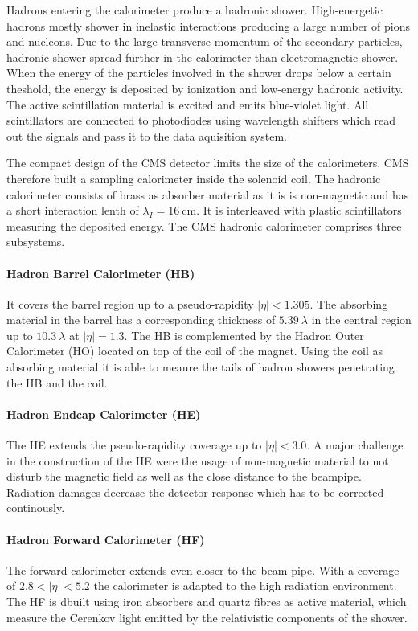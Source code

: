 Hadrons entering the calorimeter produce a hadronic shower. High-energetic
hadrons mostly shower in inelastic interactions producing a large number of pions
and nucleons. Due to the large transverse momentum of the secondary particles,
hadronic shower spread further in the calorimeter than electromagnetic shower.
When the energy of the particles involved in the shower drops below a certain
theshold, the energy is deposited by ionization and low-energy hadronic
activity. The active scintillation material is excited and emits blue-violet
light. All scintillators are connected to photodiodes using wavelength
shifters which read out the signals and pass it to the data aquisition system.

The compact design of the CMS detector limits the size of the calorimeters. CMS
therefore built a sampling calorimeter inside the solenoid coil. The hadronic
calorimeter consists of brass as absorber material as it is is non-magnetic and
has a short interaction lenth of $\lambda_I = \SI{16}{\centi\metre}$. It is
interleaved with plastic scintillators measuring the deposited energy. The CMS
hadronic calorimeter comprises three subsystems. 

\paragraph{Hadron Barrel Calorimeter (HB)}
It covers the barrel region up to a pseudo-rapidity $|\eta| < 1.305$. The
absorbing material in the barrel has a corresponding thickness of
$\SI{5.39}{\lambda}$ in the central region up to $\SI{10.3}{\lambda}$ at $|\eta|
= 1.3$. The HB is complemented by the Hadron Outer Calorimeter (HO) located on
top of the coil of the magnet. Using the coil as absorbing material it is able
to meaure the tails of hadron showers penetrating the HB and the coil.

\paragraph{Hadron Endcap Calorimeter (HE)} The HE extends the pseudo-rapidity
coverage up to $|\eta| < 3.0$. A major challenge in the construction of the HE
were the usage of non-magnetic material to not disturb the magnetic field as
well as the close distance to the beampipe. Radiation damages decrease the
detector response which has to be corrected continously. 

\paragraph{Hadron Forward Calorimeter (HF)} 
The forward calorimeter extends even closer to the beam pipe. With a coverage of
$2.8 < |\eta| < 5.2$ the calorimeter is adapted to the high radiation
environment. The HF is dbuilt using iron absorbers and quartz fibres as active
material, which measure the Cerenkov light emitted by the relativistic
components of the shower.

